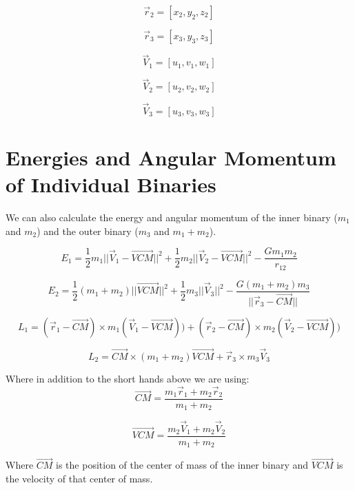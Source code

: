 \documentclass[letterpaper,12pt]{article}
\begin{document}
\begin{equation} \label{eq:ergo}
    \Vec{r}_{2} = [x_{2}, y_{2}, z_{2}]
\end{equation}

\begin{equation} \label{eq:ergo}
    \Vec{r}_{3} = [x_{3}, y_{3}, z_{3}]
\end{equation}

\begin{equation} \label{eq:ergo}
    \Vec{V}_{1} = [u_{1}, v_{1}, w_{1}]
\end{equation}

\begin{equation} \label{eq:ergo}
    \Vec{V}_{2} = [u_{2}, v_{2}, w_{2}]
\end{equation}

\begin{equation} \label{eq:ergo}
    \Vec{V}_{3} = [u_{3}, v_{3}, w_{3}]
\end{equation}

\section{Energies and Angular Momentum of Individual Binaries}

We can also calculate the energy and angular momentum of the inner binary ($m_{1}$ and $m_{2}$) and the outer binary ($m_{3}$ and $m_{1}+m_{2}$).

\begin{equation} \label{eq:ergo}
    E_{1} = \frac{1}{2}m_{1}||\Vec{V}_{1}-\Vec{VCM}||^{2}+\frac{1}{2}m_{2}||\Vec{V}_{2}-\Vec{VCM}||^{2} - \frac{Gm_{1}m_{2}}{r_{12}}
\end{equation}

\begin{equation} \label{eq:ergo}
    E_{2} = \frac{1}{2}(m_{1}+m_{2})||\Vec{VCM}||^{2}+\frac{1}{2}m_{3}||\Vec{V}_{3}||^{2} - \frac{G(m_{1}+m_{2})m_{3}}{||\Vec{r}_{3}-\Vec{CM}||}
\end{equation}

\begin{equation} \label{eq:ergo}
    L_{1} = (\Vec{r}_{1}-\Vec{CM})\times m_{1}(\Vec{V}_{1}-\Vec{VCM}))+(\Vec{r}_{2}-\Vec{CM})\times m_{2}(\Vec{V}_{2}-\Vec{VCM}))
\end{equation}

\begin{equation} \label{eq:ergo}
    L_{2} = \Vec{CM} \times (m_{1}+m_{2})\Vec{VCM}+\Vec{r}_{3}\times m_{3}\Vec{V}_{3} 
\end{equation}

Where in addition to the short hands above we are using:
\begin{equation} \label{eq:ergo}
    \Vec{CM} = \frac{m_{1}\Vec{r}_{1}+m_{2}\Vec{r}_{2}}{m_{1}+m_{2}}
\end{equation}

\begin{equation} \label{eq:ergo}
    \Vec{VCM} = \frac{m_{2}\Vec{V}_{1}+m_{2}\Vec{V}_{2}}{m_{1}+m_{2}}
\end{equation}

Where $\Vec{CM}$ is the position of the center of mass of the inner binary and $\Vec{VCM}$ is the velocity of that center of mass.
\end{document}
